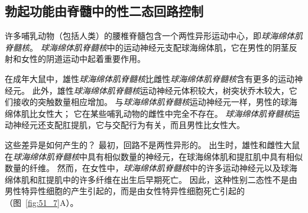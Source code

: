 \subsection{勃起功能由脊髓中的性二态回路控制}

许多哺乳动物（包括人类）的腰椎脊髓包含一个两性异形运动中心，即\textit{球海绵体肌脊髓核}。
\textit{球海绵体肌脊髓核}中的运动神经元支配球海绵体肌，它在男性的阴茎反射和女性的阴道运动中起着重要作用。


在成年大鼠中，雄性\textit{球海绵体肌脊髓核}比雌性\textit{球海绵体肌脊髓核}含有更多的运动神经元。
此外，雄性\textit{球海绵体肌脊髓核}运动神经元体积较大，树突状乔木较大，它们接收的突触数量相应增加。
与\textit{球海绵体肌脊髓核}运动神经元一样，男性的球海绵体肌比女性大；
它在某些哺乳动物的雌性中完全不存在。
\textit{球海绵体肌脊髓核}运动神经元还支配肛提肌，它与交配行为有关，而且男性比女性大。


这些差异是如何产生的？
最初，回路不是两性异形的。
出生时，雄性和雌性大鼠在\textit{球海绵体肌脊髓核}中具有相似数量的神经元，在球海绵体肌和提肛肌中具有相似数量的纤维。
然而，在女性中，\textit{球海绵体肌脊髓核}中的许多运动神经元以及球海绵体肌和肛提肌中的许多纤维在出生后早期死亡。
因此，这种性别二态性不是由男性特异性细胞的产生引起的，而是由女性特异性细胞死亡引起的（图~\ref{fig:51_7}A）。


